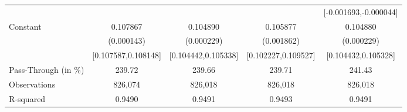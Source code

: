 {\begin{tabular}{l*{4}{c}}
                    &                     &                     &                     &[-0.001693,-0.000044]         \\
Constant            &    0.107867\sym{***}&    0.104890\sym{***}&    0.105877\sym{***}&    0.104880\sym{***}\\
                    &  (0.000143)         &  (0.000229)         &  (0.001862)         &  (0.000229)         \\
                    &[0.107587,0.108148]         &[0.104442,0.105338]         &[0.102227,0.109527]         &[0.104432,0.105328]         \\
\midrule
Pass-Through (in \%)&      239.72         &      239.66         &      239.71         &      241.43         \\
Observations        &     826,074         &     826,018         &     826,018         &     826,018         \\
R-squared           &      0.9490         &      0.9491         &      0.9493         &      0.9491         \\
\bottomrule
\end{tabular}
}
